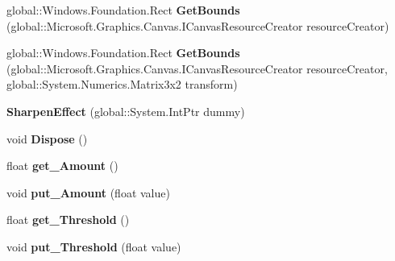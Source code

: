 \begin{DoxyCompactItemize}
global\+::\+Windows.\+Foundation.\+Rect {\bfseries Get\+Bounds} (global\+::\+Microsoft.\+Graphics.\+Canvas.\+I\+Canvas\+Resource\+Creator resource\+Creator)
\item 
\mbox{\label{class_microsoft_1_1_graphics_1_1_canvas_1_1_effects_1_1_sharpen_effect_a54df6548305c2f7ddeba7230f7fff008}} 
global\+::\+Windows.\+Foundation.\+Rect {\bfseries Get\+Bounds} (global\+::\+Microsoft.\+Graphics.\+Canvas.\+I\+Canvas\+Resource\+Creator resource\+Creator, global\+::\+System.\+Numerics.\+Matrix3x2 transform)
\item 
\mbox{\label{class_microsoft_1_1_graphics_1_1_canvas_1_1_effects_1_1_sharpen_effect_aa2c447cd17b2262cd288cbd0ecd66538}} 
{\bfseries Sharpen\+Effect} (global\+::\+System.\+Int\+Ptr dummy)
\item 
\mbox{\label{class_microsoft_1_1_graphics_1_1_canvas_1_1_effects_1_1_sharpen_effect_ab80afd02393c881baccb9ee076f0e68a}} 
void {\bfseries Dispose} ()
\item 
\mbox{\label{class_microsoft_1_1_graphics_1_1_canvas_1_1_effects_1_1_sharpen_effect_aa474bc9966d9aebafd4d25b60af032b6}} 
float {\bfseries get\+\_\+\+Amount} ()
\item 
\mbox{\label{class_microsoft_1_1_graphics_1_1_canvas_1_1_effects_1_1_sharpen_effect_aeee519576168a556c0566065630c0937}} 
void {\bfseries put\+\_\+\+Amount} (float value)
\item 
\mbox{\label{class_microsoft_1_1_graphics_1_1_canvas_1_1_effects_1_1_sharpen_effect_a0320c466d500b7944352011eb677edc0}} 
float {\bfseries get\+\_\+\+Threshold} ()
\item 
\mbox{\label{class_microsoft_1_1_graphics_1_1_canvas_1_1_effects_1_1_sharpen_effect_a5f9d61f44f74075ed5a77d67e501fc4f}} 
void {\bfseries put\+\_\+\+Threshold} (float value)

\end{DoxyCompactItemize}
